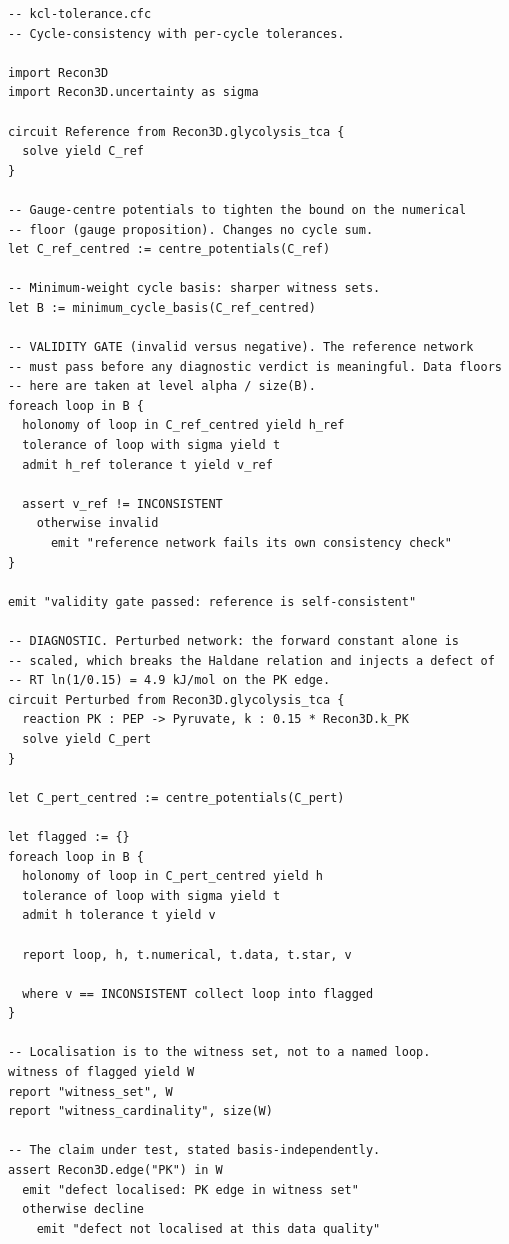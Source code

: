 \documentclass[11pt,a4paper]{article}
\theoremstyle{definition}
\theoremstyle{remark}
\begin{document}
\begin{lstlisting}[caption={The cycle-consistency test with cycle-local
tolerances. Every verdict carries its tolerance by
\Cref{thm:no-bare-verdict}; the validity gate of \Cref{crit:invalid}
precedes any diagnostic claim.},label={lst:program}]
-- kcl-tolerance.cfc
-- Cycle-consistency with per-cycle tolerances.

import Recon3D
import Recon3D.uncertainty as sigma

circuit Reference from Recon3D.glycolysis_tca {
  solve yield C_ref
}

-- Gauge-centre potentials to tighten the bound on the numerical
-- floor (gauge proposition). Changes no cycle sum.
let C_ref_centred := centre_potentials(C_ref)

-- Minimum-weight cycle basis: sharper witness sets.
let B := minimum_cycle_basis(C_ref_centred)

-- VALIDITY GATE (invalid versus negative). The reference network
-- must pass before any diagnostic verdict is meaningful. Data floors
-- here are taken at level alpha / size(B).
foreach loop in B {
  holonomy of loop in C_ref_centred yield h_ref
  tolerance of loop with sigma yield t
  admit h_ref tolerance t yield v_ref

  assert v_ref != INCONSISTENT
    otherwise invalid
      emit "reference network fails its own consistency check"
}

emit "validity gate passed: reference is self-consistent"

-- DIAGNOSTIC. Perturbed network: the forward constant alone is
-- scaled, which breaks the Haldane relation and injects a defect of
-- RT ln(1/0.15) = 4.9 kJ/mol on the PK edge.
circuit Perturbed from Recon3D.glycolysis_tca {
  reaction PK : PEP -> Pyruvate, k : 0.15 * Recon3D.k_PK
  solve yield C_pert
}

let C_pert_centred := centre_potentials(C_pert)

let flagged := {}
foreach loop in B {
  holonomy of loop in C_pert_centred yield h
  tolerance of loop with sigma yield t
  admit h tolerance t yield v

  report loop, h, t.numerical, t.data, t.star, v

  where v == INCONSISTENT collect loop into flagged
}

-- Localisation is to the witness set, not to a named loop.
witness of flagged yield W
report "witness_set", W
report "witness_cardinality", size(W)

-- The claim under test, stated basis-independently.
assert Recon3D.edge("PK") in W
  emit "defect localised: PK edge in witness set"
  otherwise decline
    emit "defect not localised at this data quality"
\end{lstlisting}
\end{document}
